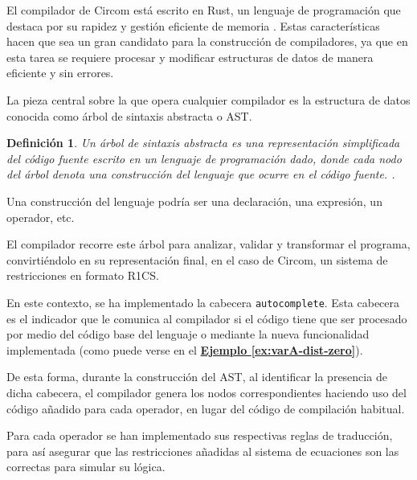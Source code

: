 \documentclass[a4paper,12pt]{report}
\newtheorem{definicion}{Definición}
\begin{document}
	\vspace{0.2cm}
	\noindent El compilador de Circom está escrito en Rust, un lenguaje de programación que destaca por su rapidez y gestión eficiente de memoria \cite{rust_lang}. Estas características hacen que sea un gran candidato para la construcción de compiladores, ya que en esta tarea se requiere procesar y modificar estructuras de datos de manera eficiente y sin errores.
	
	\vspace{0.2cm}
	\noindent La pieza central sobre la que opera cualquier compilador es la estructura de datos conocida como árbol de sintaxis abstracta o AST. 
	
	
	\begin{definicion}
		Un árbol de sintaxis abstracta es una representación simplificada del código fuente escrito en un lenguaje de programación dado, donde cada nodo del árbol denota una construcción del lenguaje que ocurre en el código fuente. \cite{wikipedia_ast}. 
	\end{definicion}
	
	\noindent Una construcción del lenguaje podría ser una declaración, una expresión, un operador, etc.
	
	\vspace{0.2cm}
	\noindent El compilador recorre este árbol para analizar, validar y transformar el programa, convirtiéndolo en su representación final, en el caso de Circom, un sistema de restricciones en formato R1CS.
	
	\vspace{0.2cm}
	\noindent En este contexto, se ha implementado la cabecera \texttt{autocomplete}. Esta cabecera es el indicador que le comunica al compilador si el código tiene que ser procesado por medio del código base del lenguaje o mediante la nueva funcionalidad implementada (como puede verse en el \hyperref[ex:varA-dist-zero]{\textbf{Ejemplo \ref{ex:varA-dist-zero}}}).
	
	\vspace{0.2cm}
	\noindent De esta forma, durante la construcción del AST, al identificar la presencia de dicha cabecera, el compilador genera los nodos correspondientes haciendo uso del código añadido para cada operador, en lugar del código de compilación habitual.
	
	\vspace{0.2cm}
	\noindent Para cada operador se han implementado sus respectivas reglas de traducción, para así asegurar que las restricciones añadidas al sistema de ecuaciones son las correctas para simular su lógica.
	
\end{document}
